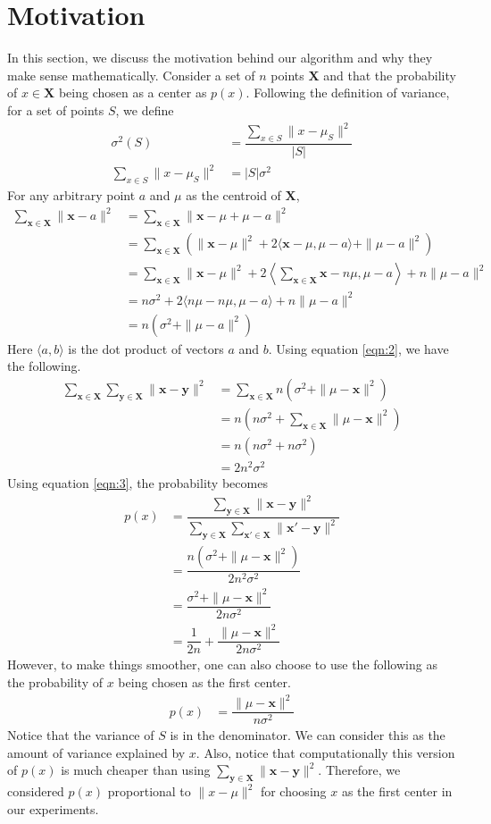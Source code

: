 \documentclass[twoside, 11pt]{article}
\newcommand{\x}{\mathbf{x}}
\newcommand{\X}{\mathbf{X}}
\newcommand{\y}{\mathbf{y}}
\begin{document}
	\section{Motivation}\label{sec:motivation}
	In this section, we discuss the motivation behind our algorithm and why they make sense mathematically. 
	Consider a set of $n$ points $\X$ and that the probability of $x\in\X$ being chosen as a center as $p(x)$. Following the definition of variance, for a set of points $S$, we define
		\begin{align}
			\sigma^2(S) & = \dfrac{\sum_{x\in S} \|x-\mu_{S}\|^2}{|S|}\nonumber\\
			\sum_{x\in S}\|x-\mu_{S}\|^2 & = |S|\sigma^2\label{eqn:1}
		\end{align}
	For any arbitrary point $a$ and $\mu$ as the centroid of $\X$,
		\begin{align}
			\sum_{\x\in\X}\|\x-a\|^2
				  & = \sum_{\x\in\X}\|\x-\mu+\mu-a\|^2\nonumber\\
				  & = \sum_{\x\in\X}\left(\|\x-\mu\|^2+2\langle\x-\mu,\mu-a\rangle+\|\mu-a\|^2\right)\nonumber\\
				  & = \sum_{\x\in\X}\|\x-\mu\|^2+2\left\langle\sum_{\x\in\X}\x-n\mu,\mu-a\right\rangle+n\|\mu-a\|^2\nonumber\\
				  & = n\sigma^2+2\langle n\mu-n\mu,\mu-a\rangle+n\|\mu-a\|^2\nonumber\\
				  & = n(\sigma^2+\|\mu-a\|^2)\label{eqn:2}
		\end{align}
	Here $\langle a,b\rangle$ is the dot product of vectors $a$ and $b$. Using equation \eqref{eqn:2}, we have the following.
		\begin{align}
			\sum_{\x\in\X}\sum_{\y\in\X}\|\x-\y\|^2 
				& = \sum_{\x\in\X}n(\sigma^2+\|\mu-\x\|^2)\nonumber\\
				& = n(n\sigma^2+\sum_{\x\in\X}\|\mu-\x\|^2)\nonumber\\
				& = n(n\sigma^2+n\sigma^2)\nonumber\\
				& = 2n^2\sigma^2\label{eqn:3}
		\end{align}
	Using equation \eqref{eqn:3}, the probability becomes
		\begin{align*}
			p(x) & = \dfrac{\sum_{\y\in\X}\|\x-\y\|^2}{\sum_{\y\in\X}\sum_{\x'\in\X}\|\x'-\y\|^2}\\
				 & = \dfrac{n(\sigma^2+\|\mu-\x\|^2)}{2n^2\sigma^2}\\
				 & = \dfrac{\sigma^2+\|\mu-\x\|^2}{2n\sigma^2}\\
				 & = \dfrac{1}{2n}+\dfrac{\|\mu-\x\|^2}{2n\sigma^2}
		\end{align*}
	However, to make things smoother, one can also choose to use the following as the probability of $x$ being chosen as the first center.
		\begin{align*}
			p(x) & = \dfrac{\|\mu-\x\|^2}{n\sigma^2}
		\end{align*}
	Notice that the variance of $S$ is in the denominator. We can consider this as the amount of variance explained by $x$. Also, notice that computationally this version of $p(x)$ is much cheaper than using $\sum_{\y\in\X}\|\x-\y\|^2$. Therefore, we considered $p(x)$ proportional to $\|x-\mu\|^2$ for choosing $x$ as the first center in our experiments.
\end{document}
